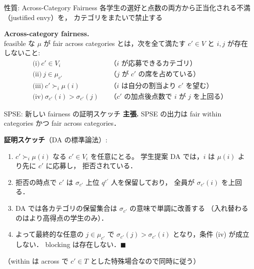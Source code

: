 \documentclass[aspectratio=43,11pt]{beamer}
\newcommand{\muc}[1]{\mu_{#1}}
\newcommand{\score}{\sigma}
\begin{document}
\begin{frame}{性質: Across-Category Fairness}
  各学生の選好と点数の両方から正当化される不満（justified envy）を，
  カテゴリをまたいで禁止する

  \vspace{1em}
  \textbf{Across-category fairness.}\\
  feasible な $\mu$ が fair across categories とは，次を全て満たす
  $c' \in V$ と $i, j$ が存在しないこと:
  \begin{align*}
    &\text{(i)}\ c' \in V_i
      &&\text{（$i$ が応募できるカテゴリ）}\\
    &\text{(ii)}\ j \in \muc{c'}
      &&\text{（$j$ が $c'$ の席を占めている）}\\
    &\text{(iii)}\ c' \succ_i \mu(i)
      &&\text{（$i$ は自分の割当より $c'$ を望む）}\\
    &\text{(iv)}\ \score_{c'}(i) > \score_{c'}(j)
      &&\text{（$c'$ の加点後点数で $i$ が $j$ を上回る）}
  \end{align*}
\end{frame}

\begin{frame}{SPSE: 新しい fairness の証明スケッチ}
  \textbf{主張.} SPSE の出力は fair within categories かつ
  fair across categories．

  \vspace{0.5em}
  \textbf{証明スケッチ}（DA の標準論法）:
  \begin{enumerate}
    \item $c' \succ_i \mu(i)$ なる $c' \in V_i$ を任意にとる。
      学生提案 DA では，$i$ は $\mu(i)$ より先に $c'$ に応募し，
      拒否されている．
    \item 拒否の時点で $c'$ は $\score_{c'}$ 上位 $q^{c'}$ 人を保留しており，
      全員が $\score_{c'}(i)$ を上回る．
    \item DA では各カテゴリの保留集合は $\score_{c'}$ の意味で単調に改善する
      （入れ替わるのはより高得点の学生のみ）．
    \item よって最終的な任意の $j \in \muc{c'}$ で
      $\score_{c'}(j) > \score_{c'}(i)$ となり，条件 (iv) が成立しない．
      blocking は存在しない．$\blacksquare$
  \end{enumerate}

  （within は across で $c' \in T$ とした特殊場合なので同時に従う）
\end{frame}
\end{document}

